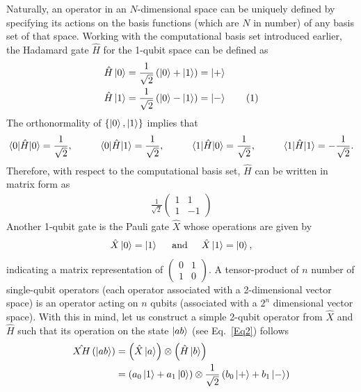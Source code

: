 \documentclass[12pt,oneside]{book}
\newcommand\numberthis{\addtocounter{equation}{1}\tag{\theequation}}
\begin{document}
Naturally, an operator in an $N$-dimensional space can be uniquely defined by specifying its actions on the basis functions (which are $N$ in number) of any basis set of that space. Working with the computational basis set introduced earlier, the Hadamard gate $\hat{H}$ for the 1-qubit space can be defined as
\begin{align*}\label{Hadamard}
    \hat{H}\ket{0} &{}= \frac{1}{\sqrt{2}}\left(\ket{0}+\ket{1}\right) = \ket{+}\\
    \hat{H}\ket{1} &{}= \frac{1}{\sqrt{2}}\left(\ket{0}-\ket{1}\right) = \ket{-}\numberthis
\end{align*}
The orthonormality of $\{\ket{0},\ket{1}\}$ implies that
\begin{align*}
    \braket{0|\hat{H}|0}=\frac{1}{\sqrt{2}}, \hspace{1cm} \braket{0|\hat{H}|1}=\frac{1}{\sqrt{2}}, \hspace{1cm} \braket{1|\hat{H}|0}=\frac{1}{\sqrt{2}}, \hspace{1cm}
    \braket{1|\hat{H}|1}=-\frac{1}{\sqrt{2}}.
\end{align*}
Therefore, with respect to the computational basis set, $\hat{H}$ can be written in matrix form as
\begin{align}
    \frac{1}{\sqrt{2}}\begin{pmatrix}
        1 & 1\\ 1 & -1
    \end{pmatrix}
\end{align}
Another 1-qubit gate is the Pauli gate $\hat{X}$ whose operations are given by
\begin{align*}
    \hat{X}\ket{0} = \ket{1} \hspace{0.5cm} \mathrm{and} \hspace{0.5cm} \hat{X}\ket{1}=\ket{0},
\end{align*}
indicating a matrix representation of $\begin{pmatrix}
    0 & 1\\ 1 & 0
\end{pmatrix}$.
A tensor-product of $n$ number of single-qubit operators (each operator associated with a 2-dimensional vector space) is an operator acting on $n$ qubits (associated with a $2^n$ dimensional vector space). With this in mind, let us construct a simple 2-qubit operator from $\hat{X}$ and $\hat{H}$ such that its operation on the state $\ket{ab}$ (see Eq.~\ref{Eq2}) follows
\begin{align}
\hat{XH}\left(\ket{ab}\right)&{}=\left(\hat{X}\ket{a}\right)\otimes\left(\hat{H}\ket{b}\right)\\
&{}=\left(a_0\ket{1}+a_1\ket{0}\right) \otimes \frac{1}{\sqrt{2}} \left(b_0\ket{+}+b_1\ket{-}\right)
\end{align}
\end{document}
